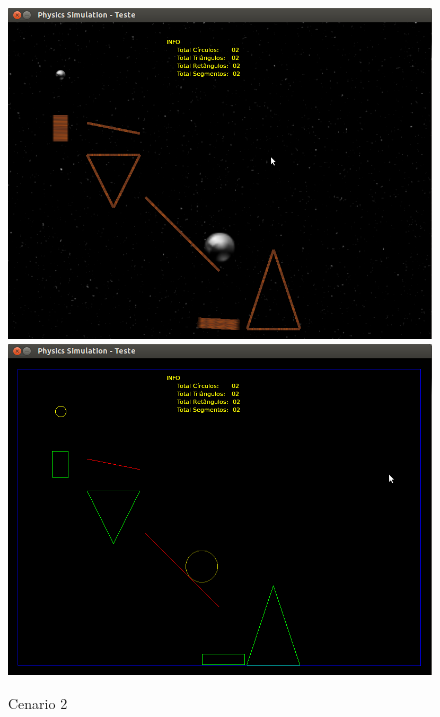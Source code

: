   \begin{figure}
	\centering
	\caption{Cenario 2}
    \includegraphics[scale=0.4]{images/cenario-todos.png}
    \includegraphics[scale=0.4]{images/cenario-todosE.png}
  \end{figure}

